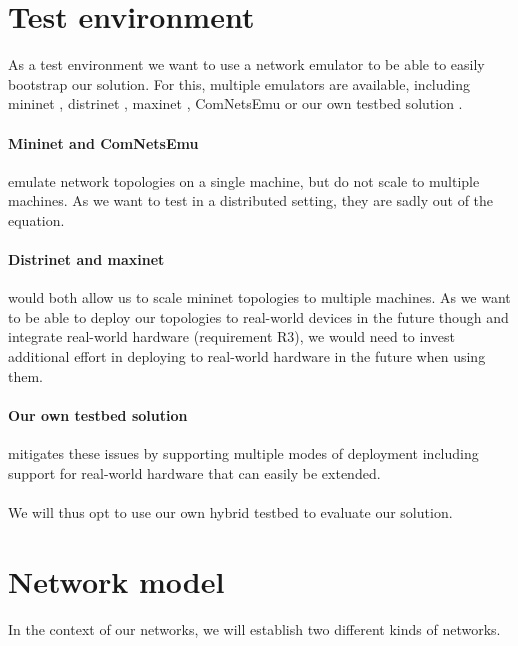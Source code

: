 \section{Test environment}
As a test environment we want to use a network emulator to be able to easily bootstrap our solution. For this, multiple emulators are available, including mininet \cite{mininet}, distrinet \cite{distrinet1, distrinet2}, maxinet \cite{maxinet}, ComNetsEmu \cite{comnetsemu} or our own testbed solution \cite{owntb}.

\paragraph{Mininet and ComNetsEmu} emulate network topologies on a single machine, but do not scale to multiple machines. As we want to test in a distributed setting, they are sadly out of the equation.

\paragraph{Distrinet and maxinet} would both allow us to scale mininet topologies to multiple machines. As we want to be able to deploy our topologies to real-world devices in the future though and integrate real-world hardware (requirement R3), we would need to invest additional effort in deploying to real-world hardware in the future when using them.

\paragraph{Our own testbed solution} mitigates these issues by supporting multiple modes of deployment including support for real-world hardware that can easily be extended.

\paragraph{} We will thus opt to use our own hybrid testbed to evaluate our solution.

\section{Network model}
In the context of our networks, we will establish two different kinds of networks.

